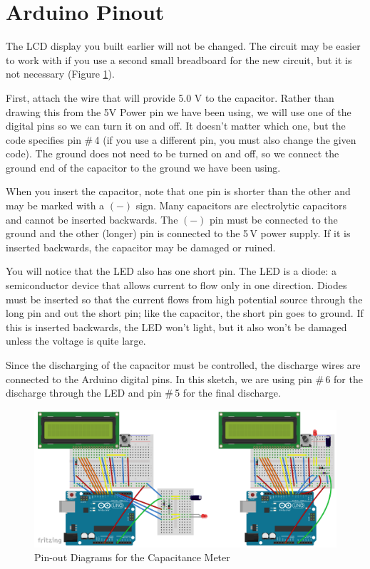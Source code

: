 \documentclass[]{article}
\begin{document}
\section{Arduino Pinout}

The LCD display you built earlier will not be changed.  The circuit may be easier to work with if you use a second small breadboard for the new circuit, but it is not necessary (Figure \ref{pinout}).  

First, attach the wire that will provide 5.0 V to the capacitor.  Rather than drawing this from the 5V Power pin we have been using, we will use one of the digital pins so we can turn it on and off.  It doesn't matter which one, but the code specifies pin \#\,4 (if you use a different pin, you must also change the given code).  The ground does not need to be turned on and off, so we connect the ground end of the capacitor to the ground we have been using.  

When you insert the capacitor, note that one pin is shorter than the other and may be marked with a \((-)\) sign.  Many capacitors are electrolytic capacitors and cannot be inserted backwards.  The \((-)\) pin must be connected to the ground and the other (longer) pin is connected to the 5\,V power supply.  If it is inserted backwards, the capacitor may be damaged or ruined.  %

You will notice that the LED also has one short pin.  The LED is a diode: a semiconductor device that allows current to flow only in one direction.  Diodes must be inserted so that the current flows from high potential source through the long pin and out the short pin; like the capacitor, the short pin goes to ground.  If this is inserted backwards, the LED won't light, but it also won't be damaged unless the voltage is quite large.  

Since the discharging of the capacitor must be controlled, the discharge wires are connected to the Arduino digital pins.  In this sketch, we are using pin \#\,6 for the discharge through the LED and pin \#\,5 for the final discharge.



	\begin{figure}[h]
		\centering
		\includegraphics[width=16cm]{pics/breadboard.png}
		\caption{Pin-out Diagrams for the Capacitance Meter}
		\label{pinout}
	\end{figure}
\end{document}
